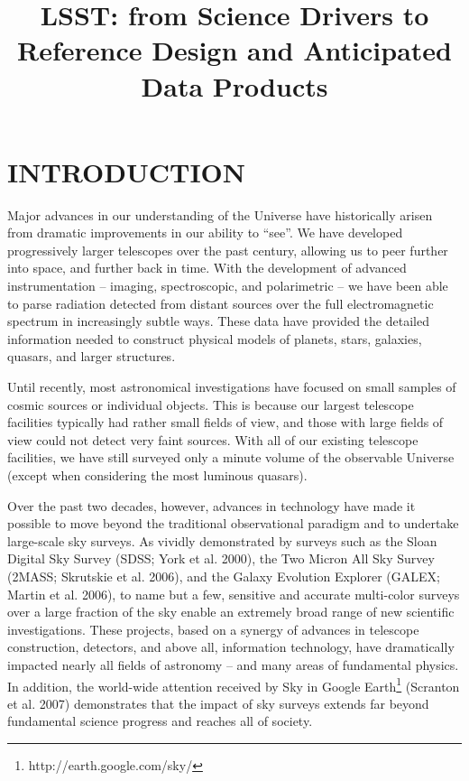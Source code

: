 \documentclass{emulateapj}
\begin{document}
\title{LSST: from Science Drivers to Reference Design and Anticipated Data Products} 





\section{INTRODUCTION}
 

Major advances in our understanding of the Universe have historically arisen
from dramatic improvements in our ability to ``see''. We have developed
progressively larger telescopes over the past century, allowing us 
to peer further into space, and further back in time. With the development of 
advanced instrumentation -- imaging, spectroscopic, and polarimetric -- we 
have been able to parse radiation detected from distant sources over the 
full electromagnetic spectrum in increasingly subtle ways. 
These data have provided the detailed information needed to construct physical 
models of planets, stars, galaxies, quasars, and larger structures. 

Until recently, most astronomical investigations have focused on small samples 
of cosmic sources or individual objects. This is because our largest telescope 
facilities typically had rather small fields of view, and those with large
fields of view could not detect very faint sources. With all of our existing 
telescope facilities, we have still surveyed only a minute volume of the 
observable Universe (except when considering the most luminous quasars). 

Over the past two decades, however, advances in technology have made it possible to 
move beyond the traditional observational paradigm and to undertake large-scale 
sky surveys. As vividly demonstrated by surveys such as the Sloan Digital Sky 
Survey (SDSS; York et al. 2000), the Two Micron All Sky Survey (2MASS;
Skrutskie et al. 2006), and the Galaxy Evolution Explorer (GALEX; Martin et
al. 2006), to name but a few, sensitive and accurate 
multi-color surveys over a large fraction of the sky enable an extremely broad range of 
new scientific investigations. These projects, based on a synergy of advances in 
telescope construction, detectors, and above all, information technology, 
have dramatically impacted nearly all fields of astronomy 
-- and many areas of fundamental physics. In addition, the world-wide attention 
received by Sky in Google Earth\footnote{http://earth.google.com/sky/} (Scranton et al. 2007) 
demonstrates that the impact of sky surveys extends
far beyond fundamental science progress and reaches all of society.
\end{document}
